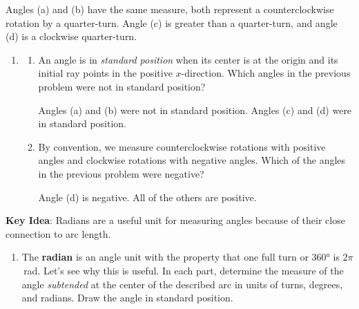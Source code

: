 \documentclass[main]{subfiles}
\begin{document}
    \begin{solution}
        Angles (a) and (b) have the same measure, both represent a counterclockwise rotation by a quarter-turn. Angle (c) is greater than a quarter-turn, and angle (d) is a clockwise quarter-turn.
    \end{solution}
\begin{enumerate}[resume]
\item
\begin{enumerate}
    \item 
    \begin{problem}
        An angle is in \emph{standard position} when its center is at the origin and its initial ray points in the positive $x$-direction. Which angles in the previous problem were not in standard position?
    \end{problem}
    \pspace{\vfill}

    \begin{solution}
        Angles (a) and (b) were not in standard position. Angles (c) and (d) were in standard position.
    \end{solution}

    \item 
    \begin{problem}
        By convention, we measure counterclockwise rotations with positive angles and clockwise rotations with negative angles. Which of the angles in the previous problem were negative?
    \end{problem}
    \pspace{\vfill}

    \begin{solution}
        Angle (d) is negative. All of the others are positive.
    \end{solution}
\end{enumerate}
\end{enumerate}

\pspace{\newpage}

\textbf{Key Idea}: Radians are a useful unit for measuring angles because of their close connection to arc length.

\begin{enumerate}[resume]
\item
The \textbf{radian} is an angle unit with the property that one full turn or \ang{360} is $2\pi$\,rad. Let's see why this is useful. In each part, determine the measure of the angle \emph{subtended} at the center of the described arc in units of turns, degrees, and radians. Draw the angle in standard position.
\end{enumerate}
\end{document}
